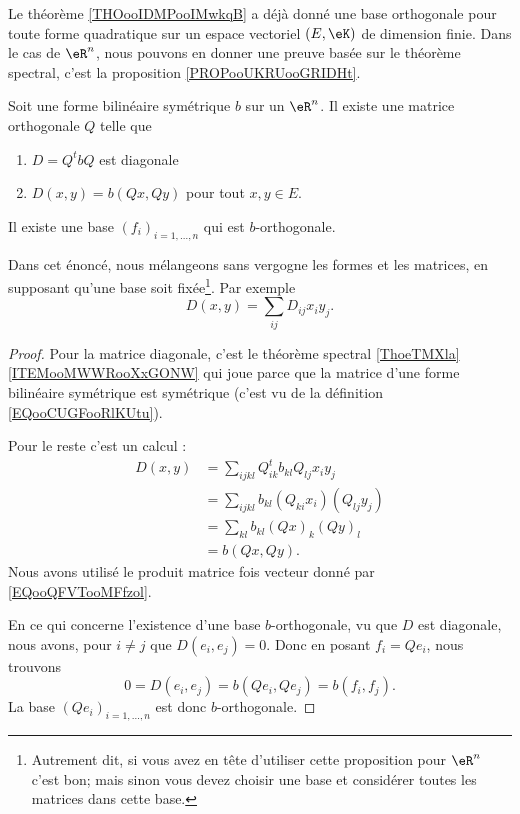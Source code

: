 Le théorème \ref{THOooIDMPooIMwkqB} a déjà donné une base orthogonale pour toute forme quadratique sur un espace vectoriel \( (E,\eK)\) de dimension finie. Dans le cas de \( \eR^n\), nous pouvons en donner une preuve basée sur le théorème spectral, c'est la proposition \ref{PROPooUKRUooGRIDHt}.

\begin{proposition}     \label{PROPooUKRUooGRIDHt}
	Soit une forme bilinéaire symétrique \( b\) sur un \( \eR^n\). Il existe une matrice orthogonale \( Q\) telle que
	\begin{enumerate}
		\item
		      \( D=Q^tbQ\) est diagonale
		\item
		      \( D(x,y)=b(Qx,Qy)\) pour tout \( x,y\in E\).
	\end{enumerate}

	Il existe une base \( (f_i)_{i=1,\ldots, n}\) qui est \( b\)-orthogonale.

	Dans cet énoncé, nous mélangeons sans vergogne les formes et les matrices, en supposant qu'une base soit fixée\footnote{Autrement dit, si vous avez en tête d'utiliser cette proposition pour \( \eR^n\) c'est bon; mais sinon vous devez choisir une base et considérer toutes les matrices dans cette base.}. Par exemple
	\begin{equation}
		D(x,y)=\sum_{ij}D_{ij}x_iy_j.
	\end{equation}
\end{proposition}

\begin{proof}
	Pour la matrice diagonale, c'est le théorème spectral \ref{ThoeTMXla}\ref{ITEMooMWWRooXxGONW} qui joue parce que la matrice d'une forme bilinéaire symétrique est symétrique (c'est vu de la définition \eqref{EQooCUGFooRlKUtu}).

	Pour le reste c'est un calcul :
	\begin{subequations}
		\begin{align}
			D(x,y) & =\sum_{ijkl}Q^t_{ik}b_{kl}Q_{lj}x_iy_j   \\
			       & =\sum_{ijkl}b_{kl}(Q_{ki}x_i)(Q_{lj}y_j) \\
			       & =\sum_{kl}b_{kl}(Qx)_k(Qy)_l             \\
			       & =b(Qx,Qy).
		\end{align}
	\end{subequations}
	Nous avons utilisé le produit matrice fois vecteur donné par \eqref{EQooQFVTooMFfzol}.

	En ce qui concerne l'existence d'une base \( b\)-orthogonale, vu que \( D\) est diagonale, nous avons, pour \( i\neq j\) que \( D(e_i,e_j)=0\). Donc en posant \( f_i=Qe_i\), nous trouvons
	\begin{equation}
		0=D(e_i,e_j)=b(Qe_i,Qe_j)=b(f_i,f_j).
	\end{equation}
	La base \( (Qe_i)_{i=1,\ldots, n}\) est donc \( b\)-orthogonale.
\end{proof}
